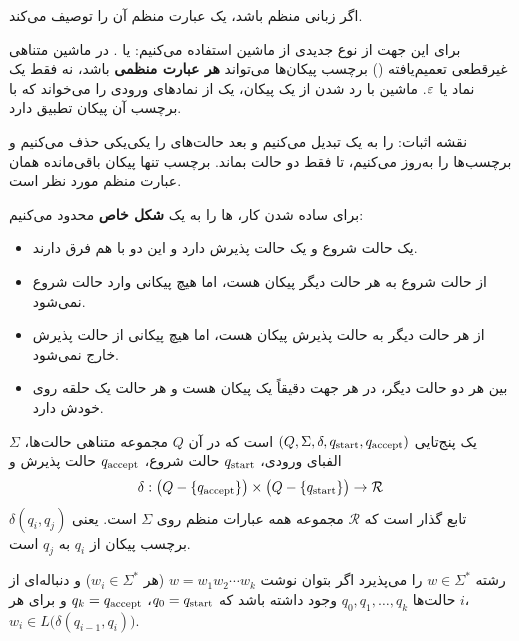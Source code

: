 \begin{lemma}\label{lem:dfa-re}
اگر زبانی منظم باشد، یک عبارت منظم آن را توصیف می‌کند.
\end{lemma}

برای این جهت از نوع جدیدی از ماشین استفاده می‌کنیم:  یا . در ماشین متناهی غیرقطعی تعمیم‌یافته () برچسب پیکان‌ها می‌تواند \textbf{هر عبارت منظمی} باشد، نه فقط یک نماد یا $\varepsilon$. ماشین با رد شدن از یک پیکان، یک  از نمادهای ورودی را می‌خواند که با برچسب آن پیکان تطبیق دارد.

نقشه اثبات:  را به یک  تبدیل می‌کنیم و بعد حالت‌های  را یکی‌یکی حذف می‌کنیم و برچسب‌ها را به‌روز می‌کنیم، تا فقط دو حالت بماند. برچسب تنها پیکان باقی‌مانده همان عبارت منظم مورد نظر است.

\begin{ltrfig}
\end{ltrfig}

برای ساده شدن کار، ها را به یک \textbf{شکل خاص} محدود می‌کنیم:
\begin{itemize}
\item یک حالت شروع و یک حالت پذیرش دارد و این دو با هم فرق دارند.
\item از حالت شروع به هر حالت دیگر پیکان هست، اما هیچ پیکانی وارد حالت شروع نمی‌شود.
\item از هر حالت دیگر به حالت پذیرش پیکان هست، اما هیچ پیکانی از حالت پذیرش خارج نمی‌شود.
\item بین هر دو حالت دیگر، در هر جهت دقیقاً یک پیکان هست و هر حالت یک حلقه روی خودش دارد.
\end{itemize}

\begin{definition}[\lr{GNFA}]
یک  پنج‌تایی $(Q,\Sigma,\delta,q_{\mathrm{start}},q_{\mathrm{accept}})$ است که در آن $Q$ مجموعه متناهی حالت‌ها، $\Sigma$ الفبای ورودی، $q_{\mathrm{start}}$ حالت شروع، $q_{\mathrm{accept}}$ حالت پذیرش و
\[\delta:\big(Q-\{q_{\mathrm{accept}}\}\big)\times\big(Q-\{q_{\mathrm{start}}\}\big)\to\mathcal{R}\]
تابع گذار است که $\mathcal{R}$ مجموعه همه عبارات منظم روی $\Sigma$ است. یعنی $\delta(q_i,q_j)$ برچسب پیکان از $q_i$ به $q_j$ است.

 رشته $w\in\Sigma^*$ را می‌پذیرد اگر بتوان نوشت $w=w_1w_2\cdots w_k$ (هر $w_i\in\Sigma^*$) و دنباله‌ای از حالت‌ها $q_0,q_1,\dots,q_k$ وجود داشته باشد که $q_0=q_{\mathrm{start}}$، $q_k=q_{\mathrm{accept}}$ و برای هر $i$، $w_i\in L\big(\delta(q_{i-1},q_i)\big)$.
\end{definition}

